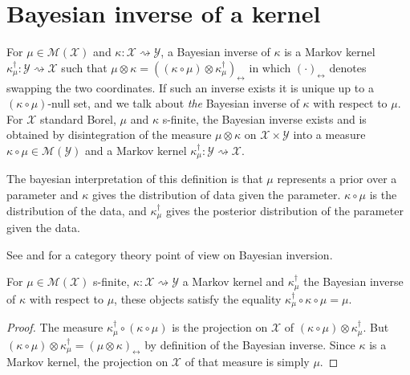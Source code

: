 \chapter{Bayesian inverse of a kernel}

\begin{definition}
  \label{def:bayesInv}
  For $\mu \in \mathcal M(\mathcal X)$ and $\kappa : \mathcal X \rightsquigarrow \mathcal Y$, a Bayesian inverse of $\kappa$ is a Markov kernel $\kappa_\mu^\dagger : \mathcal Y \rightsquigarrow \mathcal X$ such that $\mu \otimes \kappa = ((\kappa \circ \mu) \otimes \kappa_\mu^\dagger)_\leftrightarrow$ in which $(\cdot)_\leftrightarrow$ denotes swapping the two coordinates.
  If such an inverse exists it is unique up to a $(\kappa \circ \mu)$-null set, and we talk about \emph{the} Bayesian inverse of $\kappa$ with respect to $\mu$.
  For $\mathcal X$ standard Borel, $\mu$ and $\kappa$ s-finite, the Bayesian inverse exists and is obtained by disintegration of the measure $\mu \otimes \kappa$ on $\mathcal X \times \mathcal Y$ into a measure $\kappa \circ \mu \in \mathcal M(\mathcal Y)$ and a Markov kernel $\kappa_\mu^\dagger: \mathcal Y \rightsquigarrow \mathcal X$.
\end{definition}

The bayesian interpretation of this definition is that $\mu$ represents a prior over a parameter and $\kappa$ gives the distribution of data given the parameter. $\kappa \circ \mu$ is the distribution of the data, and $\kappa_\mu^\dagger$ gives the posterior distribution of the parameter given the data.

See \cite{clerc2017pointless} and \cite{dahlqvist2018borel} for a category theory point of view on Bayesian inversion.

\begin{lemma}
  \label{lem:bayesInv_comp_self}
  For $\mu \in \mathcal M(\mathcal X)$ s-finite, $\kappa : \mathcal X \rightsquigarrow \mathcal Y$ a Markov kernel and $\kappa_\mu^\dagger$ the Bayesian inverse of $\kappa$ with respect to $\mu$, these objects satisfy the equality $\kappa_\mu^\dagger \circ \kappa \circ \mu = \mu$.
\end{lemma}

\begin{proof}%
\uses{}
The measure $\kappa_\mu^\dagger \circ (\kappa \circ \mu)$ is the projection on $\mathcal X$ of $(\kappa \circ \mu) \otimes \kappa_\mu^\dagger$. But $(\kappa \circ \mu) \otimes \kappa_\mu^\dagger = (\mu \otimes \kappa)_\leftrightarrow$ by definition of the Bayesian inverse. Since $\kappa$ is a Markov kernel, the projection on $\mathcal X$ of that measure is simply $\mu$.
\end{proof}

